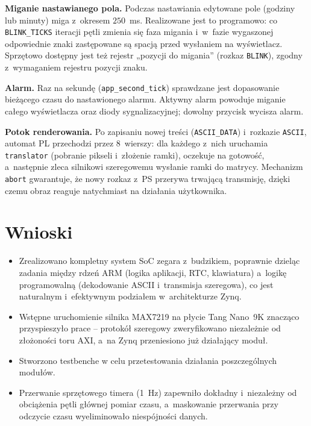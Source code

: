 \documentclass[12pt,a4paper]{article}
\begin{document}
\textbf{Miganie nastawianego pola.} Podczas nastawiania edytowane pole
(godziny lub minuty) miga z~okresem $250$~ms. Realizowane jest to programowo:
co \texttt{BLINK\_TICKS} iteracji pętli zmienia się faza migania i~w~fazie
wygaszonej odpowiednie znaki zastępowane są spacją przed wysłaniem na
wyświetlacz. Sprzętowo dostępny jest też rejestr „pozycji do migania”
(rozkaz \texttt{BLINK}), zgodny z~wymaganiem rejestru pozycji znaku.

\textbf{Alarm.} Raz na sekundę (\texttt{app\_second\_tick}) sprawdzane jest
dopasowanie bieżącego czasu do nastawionego alarmu. Aktywny alarm powoduje
miganie całego wyświetlacza oraz diody sygnalizacyjnej; dowolny przycisk
wycisza alarm.

\textbf{Potok renderowania.} Po zapisaniu nowej treści (\texttt{ASCII\_DATA})
i~rozkazie \texttt{ASCII}, automat PL przechodzi przez 8~wierszy: dla każdego
z~nich uruchamia \texttt{translator} (pobranie pikseli i~złożenie ramki),
oczekuje na gotowość, a~następnie zleca silnikowi szeregowemu wysłanie ramki
do matrycy. Mechanizm \texttt{abort} gwarantuje, że nowy rozkaz z~PS przerywa
trwającą transmisję, dzięki czemu obraz reaguje natychmiast na działania
użytkownika.

\section{Wnioski}

\begin{itemize}
    \item Zrealizowano kompletny system SoC zegara z~budzikiem, poprawnie
          dzieląc zadania między rdzeń ARM (logika aplikacji, RTC, klawiatura)
          a~logikę programowalną (dekodowanie ASCII i~transmisja szeregowa),
          co jest naturalnym i~efektywnym podziałem w~architekturze Zynq.
    \item Wstępne uruchomienie silnika MAX7219 na płycie Tang Nano~9K
          znacząco przyspieszyło prace -- protokół szeregowy zweryfikowano
          niezależnie od złożoności toru AXI, a~na Zynq przeniesiono już
          działający moduł.
    \item Stworzono testbenche w celu przetestowania działania poszczególnych modułów.
    \item Przerwanie sprzętowego timera (1~Hz) zapewniło dokładny i~niezależny
          od obciążenia pętli głównej pomiar czasu, a~maskowanie przerwania
          przy odczycie czasu wyeliminowało niespójności danych.
\end{itemize}
\end{document}
